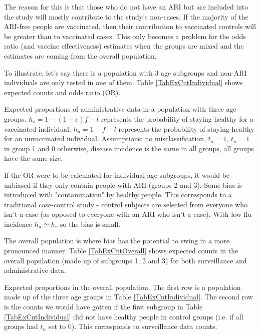\documentclass[11pt]{article}
\begin{document}
The reason for this is that those who do not have an ARI but are included into the study will mostly contribute to the study's non-cases. If the majority of the ARI-free people are vaccinated, then their contribution to vaccinated controls will be greater than to vaccinated cases. This only becomes a problem for the odds ratio (and vaccine effectiveness) estimates when the groups are mixed and the estimates are coming from the overall population.

To illustrate, let's say there is a population with 3 age subgroups and non-ARI individuals are only tested in one of them. Table \ref{TabExCntIndividual} shows expected counts and odds ratio (OR).

\begin{table}[h]
\centering
\caption{
Expected proportions of administrative data in a population with three age groups. $h_v = 1 - (1-e)f - l$ represents the probability of staying healthy for a vaccinated individual. $h_u = 1 - f - l$ represents the probability of staying healthy for an unvaccinated individual.
Assumptions: no misclassification, $t_a=1$, $t_n=1$ in group 1 and 0 otherwise, disease incidence is the same in all groups, all groups have the same size. 
 \label{TabExCntIndividual}
}
	
\end{table}

If the OR were to be calculated for individual age subgroups, it would be unbiased if they only contain people with ARI (groups 2 and 3). Some bias is introduced with "contamination" by healthy people. This corresponds to a traditional case-control study - control subjects are selected from everyone who isn't a case (as opposed to everyone with an ARI who isn't a case). With low flu incidence $h_u \simeq h_v$ so the bias is small. 

The overall population is where bias has the potential to swing in a more pronounced manner. Table \ref{TabExCntOverall} shows expected counts in the overall population (made up of subgroups 1, 2 and 3) for both surveillance and administrative data.

\begin{table}[h]
\centering
\caption{
Expected proportions in the overall population. The first row is a population made up of the three age groups in Table \ref{TabExCntIndividual}. The second row is the counts we would have gotten if the first subgroup in Table \ref{TabExCntIndividual} did not have healthy people in control groups (i.e. if all groups had $t_n$ set to 0). This corresponds to surveillance data counts. \label{TabExCntOverall}
}
	
\end{table}
\end{document}
